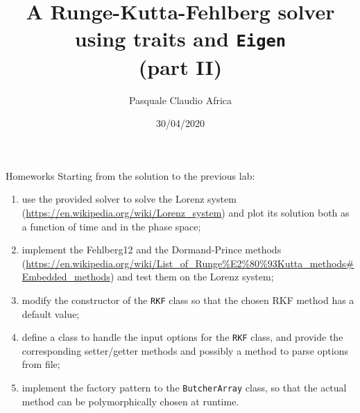 \documentclass[10pt]{beamer}
\begin{document}
    \title{A Runge-Kutta-Fehlberg solver\protect\\using traits and \texttt{Eigen}\protect\\(part II)}
    \author{Pasquale Claudio Africa}
    \date{30/04/2020}

\begin{frame}
    \maketitle
\end{frame}

\begin{frame}{Homeworks}
Starting from the solution to the previous lab:
\begin{enumerate}
\item use the provided solver to solve the Lorenz system (\url{https://en.wikipedia.org/wiki/Lorenz_system}) and plot its solution both as a function of time and in the phase space;
\item implement the Fehlberg12 and the Dormand-Prince methods (\url{https://en.wikipedia.org/wiki/List_of_Runge\%E2\%80\%93Kutta_methods\#Embedded_methods}) and test them on the Lorenz system;
\item modify the constructor of the \texttt{RKF} class so that the chosen RKF method has a default value;
\item define a class to handle the input options for the \texttt{RKF} class, and provide the corresponding setter/getter methods and possibly a method to parse options from file;
\item implement the factory pattern to the \texttt{ButcherArray} class, so that the actual method can be polymorphically chosen at runtime.
\end{enumerate}
\end{frame}
\end{document}
